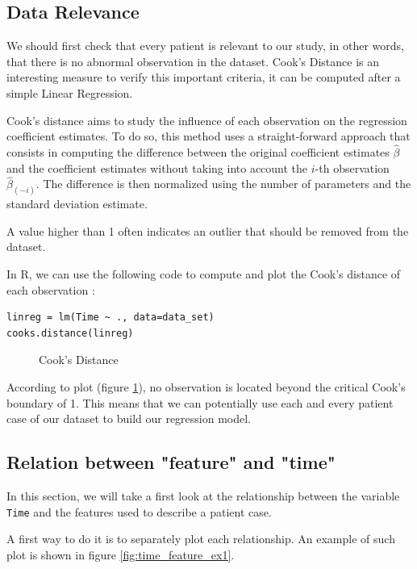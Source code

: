 \documentclass[]{report}
\newcommand{\inputtikz}[2]{%
	\scalebox{#1}{}  
}
\begin{document}
\subsection{Data Relevance}
We should first check that every patient is relevant to our study, in other words, that there is no abnormal observation in the dataset. Cook's Distance is an interesting measure to verify this important criteria, it can be computed after a simple Linear Regression.

Cook's distance aims to study the influence of each observation on the regression coefficient estimates. To do so, this method uses a straight-forward approach that consists in computing the difference between the original coefficient estimates $\hat{\beta}$ and the coefficient estimates without taking into account the $i$-th observation $\hat{\beta}_{(-i)}$. The difference is then normalized using the number of parameters and the standard deviation estimate. 

A value higher than 1 often indicates an outlier that should be removed from the dataset.

In R, we can use the following code to compute and plot the Cook's distance of each observation :

\begin{lstlisting}
linreg = lm(Time ~ ., data=data_set)
cooks.distance(linreg)
\end{lstlisting} 

\begin{figure}[!h]
	\centering
	\inputtikz{0.5}{Figures/cooks_distance.tex}
	\caption{Cook's Distance}
	\label{fig:cook_distance}
\end{figure}

According to plot (figure \ref{fig:cook_distance}), no observation is located beyond the critical Cook's boundary of 1. This means that we can potentially use each and every patient case of our dataset to build our regression model. 

\subsection{Relation between "feature" and "time"}
In this section, we will take a first look at the relationship between the variable \texttt{Time} and the features used to describe a patient case. 

A first way to do it is to separately plot each relationship. An example of such plot is shown in figure \ref{fig:time_feature_ex1}. 
\end{document}
